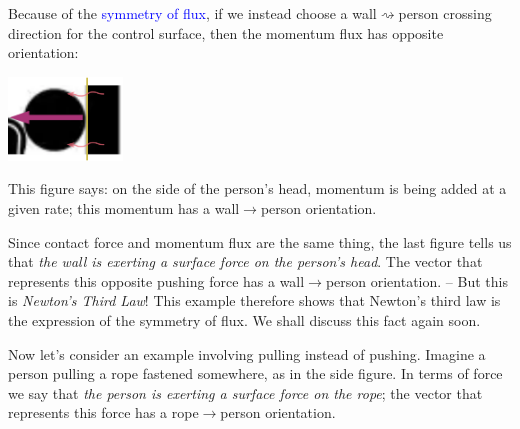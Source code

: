\documentclass[a4paper,12pt,%
onecolumn,oneside,%
british%
]{memoir}
\renewcommand*{\|}[1][]{\nonscript\:#1\vert\nonscript\:\mathopen{}}
\newcommand*{\sect}{\S}%
\renewcommand*{\autoref}[2]{\sidepar{\vspace{-1ex}\footnotesize{\color{blue}\faIcon{%
angle-right%
}\enskip\sect~\ref{#1} page~\pageref{#1}}}\textcolor{blue}{#2}}
\begin{document}
Because of the \autoref{def:symmetryflux}{symmetry of flux}, if we instead choose a wall$\rightsquigarrow$person crossing direction for the control surface, then the momentum flux has opposite orientation:\noprelistbreak
\begin{center}
  \includegraphics[height=6em]{images/person_push_flux_left.pdf}
\end{center}
This figure says: on the side of the person's head, momentum is being added at a given rate; this momentum has a wall$\rightarrow$person orientation.

Since contact force and momentum flux are the same thing, the last figure tells us that \emph{the wall is exerting a surface force on the person's head}. The vector that represents this opposite pushing force has a wall$\to$person orientation. -- But this is \emph{Newton's Third Law}! This example therefore shows that Newton's third law is the expression of the symmetry of flux. We shall discuss this fact again soon.

\medskip

Now let's consider an example involving pulling instead of pushing. Imagine a person pulling a rope fastened somewhere, as in the side figure. In terms of force we say that \emph{the person is exerting a surface force on the rope}; the vector that represents this force has a rope$\rightarrow$person orientation.
%
%
\end{document}
